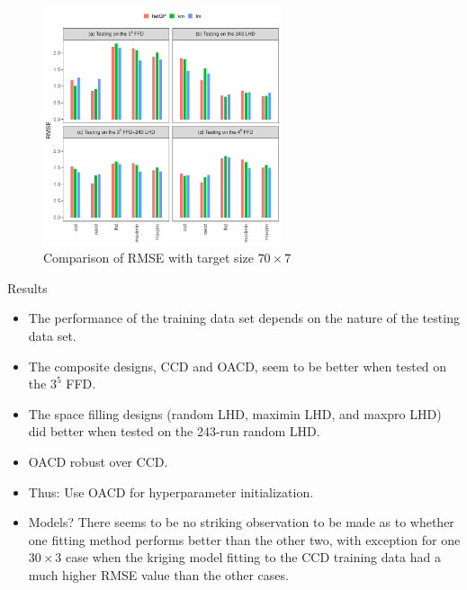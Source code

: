 \documentclass{beamer}
\begin{document}
\begin{frame}

\begin{figure}%
\centering
\includegraphics[height=7cm]{../chapters/DE/pdfs/barplots3}
\caption{Comparison of RMSE with target size $70\times7$}
\label{barplots3}
\end{figure}
\end{frame}
\begin{frame}{Results}
\begin{itemize}
\item The performance of the training data set depends on the nature of the testing data set.
\item The composite designs, CCD and OACD, seem to be better when tested on the $3^5$ FFD.
\item The space filling designs (random LHD, maximin LHD, and maxpro LHD) did better when tested on the 243-run random LHD.
\item OACD robust over CCD.
\item Thus: Use OACD for hyperparameter initialization.
\item Models?  There seems to be no striking observation to be made as to whether one fitting method performs better than the other two, with  exception for one $30 \times 3$ case when the kriging model fitting to the CCD training data had a much higher RMSE value than the other cases.
\end{itemize}
\end{frame}
\end{document}
